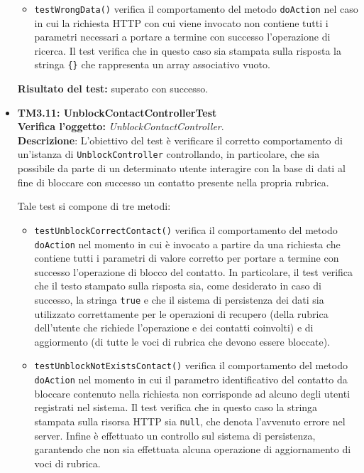 \begin{itemize}
\begin{itemize}
\item \texttt{testWrongData()} verifica il comportamento del metodo \texttt{doAction} nel caso in cui la richiesta HTTP con cui viene invocato non contiene tutti i parametri necessari a portare a termine con successo l'operazione di ricerca. Il test verifica che in questo caso sia stampata sulla risposta la stringa \texttt{\{\}} che rappresenta un array associativo vuoto.
\end{itemize}
\textbf{Risultato del test:} superato con successo.


\item \textbf{TM3.11: UnblockContactControllerTest}\\
\textbf{Verifica l'oggetto:} \textit{UnblockContactController}.\\
\textbf{Descrizione}: L'obiettivo del test è verificare il corretto comportamento di un'istanza di \texttt{UnblockController} controllando, in particolare, che sia possibile da parte di un determinato utente interagire con la base di dati al fine di bloccare con successo un contatto presente nella propria rubrica.

Tale test si compone di tre metodi:
\begin{itemize}
\item \texttt{testUnblockCorrectContact()} verifica il comportamento del metodo \texttt{doAction} nel momento in cui è invocato a partire da una richiesta che contiene tutti i parametri di valore corretto per portare a termine con successo l'operazione di blocco del contatto. In particolare, il test verifica che il testo stampato sulla risposta sia, come desiderato in caso di successo, la stringa \texttt{true} e che il sistema di persistenza dei dati sia utilizzato correttamente per le operazioni di recupero (della rubrica dell'utente che richiede l'operazione e dei contatti coinvolti) e di aggiormento (di tutte le voci di rubrica che devono essere bloccate).

\item \texttt{testUnblockNotExistsContact()} verifica il comportamento del metodo \texttt{doAction} nel momento in cui il parametro identificativo del contatto da bloccare contenuto nella richiesta non corrisponde ad alcuno degli utenti registrati nel sistema.
Il test verifica che in questo caso la stringa stampata sulla risorsa HTTP sia \texttt{null}, che denota l'avvenuto errore nel server. Infine è effettuato un controllo sul sistema di persistenza, garantendo che non sia effettuata alcuna operazione di aggiornamento di voci di rubrica.


\end{itemize}
\end{itemize}
